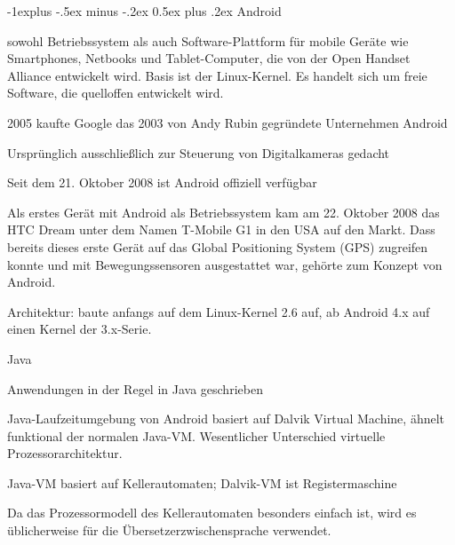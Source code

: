 \documentclass[a4paper, 8pt]{article}
\makeatletter
\renewcommand{\subsection}{\@startsection{subsection}{2}{0mm}%
                                {-1explus -.5ex minus -.2ex}%
                                {0.5ex plus .2ex}%
                                {\normalfont\normalsize\bfseries}}
\makeatother
\begin{document}
\begin{multicols*}{2}
  \subsection{Android}
  \begin{itemize*}
    \item sowohl Betriebssystem als auch Software-Plattform für mobile Geräte wie Smartphones, Netbooks und Tablet-Computer, die von der Open Handset Alliance entwickelt wird. Basis ist der Linux-Kernel. Es handelt sich um freie Software, die quelloffen entwickelt wird.
    \item 2005 kaufte Google das 2003 von Andy Rubin gegründete Unternehmen Android
    \item Ursprünglich ausschließlich zur Steuerung von Digitalkameras gedacht
    \item Seit dem 21. Oktober 2008 ist Android offiziell verfügbar
    \item Als erstes Gerät mit Android als Betriebssystem kam am 22. Oktober 2008 das HTC Dream unter dem Namen T-Mobile G1 in den USA auf den Markt. Dass bereits dieses erste Gerät auf das Global Positioning System (GPS) zugreifen konnte und mit Bewegungssensoren ausgestattet war, gehörte zum Konzept von Android.
    \item Architektur: baute anfangs auf dem Linux-Kernel 2.6 auf, ab Android 4.x auf einen Kernel der 3.x-Serie.
    \item Java
    \begin{itemize*}
      \item Anwendungen in der Regel in Java geschrieben
      \item Java-Laufzeitumgebung von Android basiert auf Dalvik Virtual Machine, ähnelt funktional der normalen Java-VM. Wesentlicher Unterschied virtuelle Prozessorarchitektur.
      \item Java-VM basiert auf Kellerautomaten; Dalvik-VM ist Registermaschine
      \item Da das Prozessormodell des Kellerautomaten besonders einfach ist, wird es üblicherweise für die Übersetzerzwischensprache verwendet.
    \end{itemize*}
  \end{itemize*}


\end{multicols*}
\end{document}
